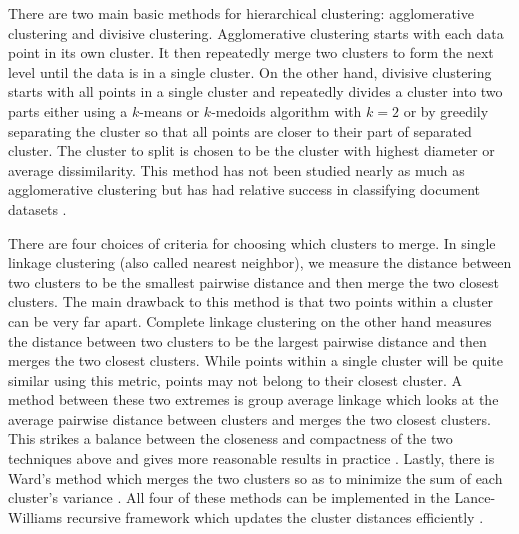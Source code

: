 \documentclass{article}
\begin{document}
There are two main basic methods for hierarchical clustering: agglomerative clustering and divisive clustering. Agglomerative clustering starts with each data point in its own cluster. It then repeatedly merge two clusters to form the next level until the data is in a single cluster. On the other hand, divisive clustering starts with all points in a single cluster and repeatedly divides a cluster into two parts either using a $k$-means or $k$-medoids algorithm with $k=2$ or by greedily separating the cluster so that all points are closer to their part of separated cluster. The cluster to split is chosen to be the cluster with highest diameter or average dissimilarity. This method has not been studied nearly as much as agglomerative clustering \cite{ESL} but has had relative success in classifying document datasets \cite{Zhao}. 

There are four choices of criteria for choosing which clusters to merge. 
In single linkage clustering (also called nearest neighbor), we measure the distance between two clusters to be the smallest pairwise distance and then merge the two closest clusters. The main drawback to this method is that two points within a cluster can be very far apart. Complete linkage clustering on the other hand measures the distance between two clusters to be the largest pairwise distance and then merges the two closest clusters. While points within a single cluster will be quite similar using this metric, points may not belong to their closest cluster. 
A method between these two extremes is group average linkage which looks at the average pairwise distance between clusters and merges the two closest clusters. This strikes a balance between the closeness and compactness of the two techniques above and gives more reasonable results in practice \cite{ESL}. Lastly, there is Ward's method which merges the two clusters so as to minimize the sum of each cluster's variance \cite{Ward}. All four of these methods can be implemented in the Lance-Williams recursive framework which updates the cluster distances efficiently \cite{Lance}.
\end{document}
